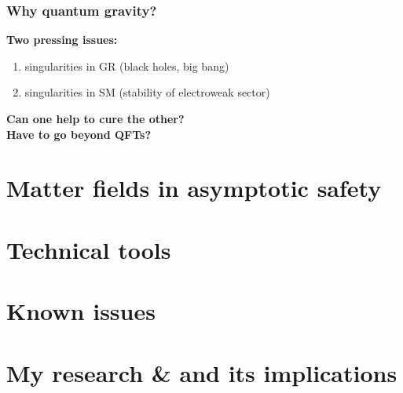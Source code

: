 \documentclass{beamer}
\begin{document}
\begin{frame}
  \frametitle{Why quantum gravity?}
  \textbf{Two pressing issues:}
  \begin{enumerate}
    \item singularities in GR (black holes, big bang)
      \hspace{2cm}
    \item singularities in SM (stability of electroweak sector)
      \hspace{1cm}
  \end{enumerate}
  \vfill
  \begin{center}
    \fontsize{12pt}{7.2}\selectfont
    \textbf{ Can one help to cure the other? } \\[15pt]
    \textbf{ Have to go beyond QFTs? }
  \end{center}
\end{frame}

\section{Matter fields in asymptotic safety}
\section{Technical tools}
\section{Known issues}
\section{My research \& and its implications}
\end{document}
